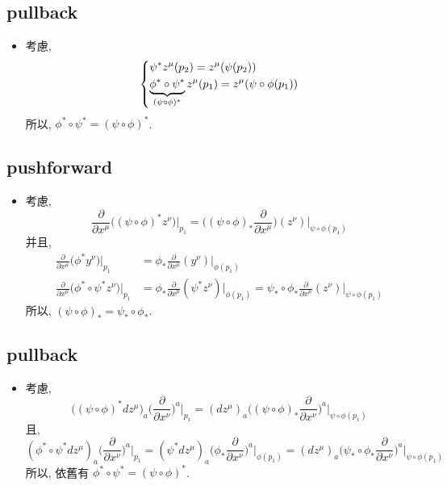 \subsection{pullback}
\begin{itemize}
	\item 考慮,
	\begin{equation}
		\begin{dcases}
			\psi^* z^\mu(p_2) = z^\mu(\psi(p_2)) \\
			\underbrace{\phi^* \circ \psi^*}_{(\psi \circ \phi)^*} z^\mu(p_1) = z^\mu(\psi \circ \phi(p_1))
		\end{dcases}
	\end{equation}
	所以, $\phi^* \circ \psi^* = (\psi \circ \phi)^*$.
\end{itemize}

\subsection{pushforward}
\begin{itemize}
	\item 考慮,
	\begin{equation}
		\frac{\partial}{\partial x^\mu} \big( (\psi \circ \phi)^* z^\nu \big) \Big|_{p_1} = \Big( (\psi \circ \phi)_* \frac{\partial}{\partial x^\mu} \Big) (z^\nu) \Big|_{\psi \circ \phi(p_1)}
	\end{equation}
	并且,
	\begin{align}
		\frac{\partial}{\partial x^\mu} \big( \phi^* y^\nu \big) \Big|_{p_1} &= \phi_* \frac{\partial}{\partial x^\mu} (y^\nu) \Big|_{\phi(p_1)} \\
		\frac{\partial}{\partial x^\mu} \big( \phi^* \circ \psi^* z^\nu \big) \Big|_{p_1} &= \phi_* \frac{\partial}{\partial x^\mu} (\psi^* z^\nu) \Big|_{\phi(p_1)} = \psi_* \circ \phi_* \frac{\partial}{\partial x^\mu} (z^\nu) \Big|_{\psi \circ \phi(p_1)}
	\end{align}
	所以, $(\psi \circ \phi)_* = \psi_* \circ \phi_*$.
\end{itemize}

\subsection{pullback}
\begin{itemize}
	\item 考慮,
	\begin{equation}
		\big( (\psi \circ \phi)^* dz^\mu \big)_a \Big( \frac{\partial}{\partial x^\nu} \Big)^a \Big|_{p_1} = (dz^\mu)_a \Big( (\psi \circ \phi)_* \frac{\partial}{\partial x^\nu} \Big)^a \Big|_{\psi \circ \phi(p_1)}
	\end{equation}
	且,
	\begin{equation}
		(\phi^* \circ \psi^* dz^\mu)_a \Big( \frac{\partial}{\partial x^\nu} \Big)^a \Big|_{p_1} = (\psi^* dz^\mu)_a \Big( \phi_* \frac{\partial}{\partial x^\nu} \Big)^a \Big|_{\phi(p_1)} = (dz^\mu)_a \Big( \psi_* \circ \phi_* \frac{\partial}{\partial x^\nu} \Big)^a \Big|_{\psi \circ \phi(p_1)}
	\end{equation}
	所以, 依舊有 $\phi^* \circ \psi^* = (\psi \circ \phi)^*$.
\end{itemize}

